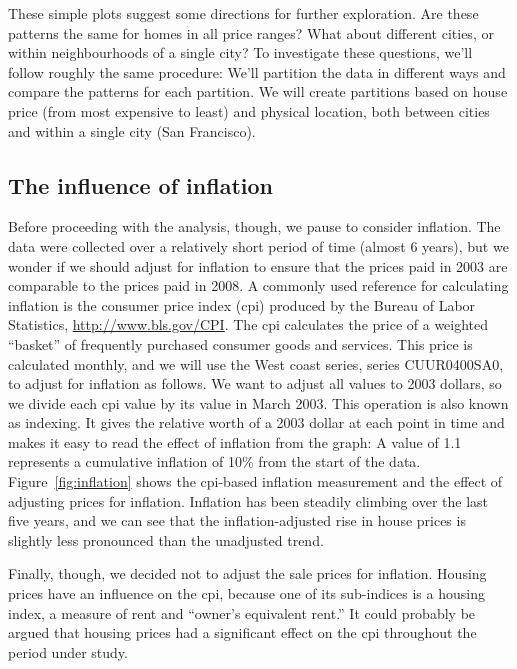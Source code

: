 \documentclass[oneside]{article}
\begin{document}
These simple plots suggest some directions for further exploration.  Are these patterns the same for homes in all price ranges?  What about different cities, or within neighbourhoods of a single city?  To investigate these questions, we'll follow roughly the same procedure:  We'll partition the data in different ways and compare the patterns for each partition.  We will create partitions based on house price (from most expensive to least) and physical location, both between cities and within a single city (San Francisco).

\subsection{The influence of inflation}

Before proceeding with the analysis, though, we pause to consider inflation. The data were collected over a relatively short period of time (almost 6 years), but we wonder if we should adjust for inflation to ensure that the prices paid in 2003 are comparable to the prices paid in 2008.  A commonly used reference for calculating inflation is the consumer price index ({\sc cpi}) produced by the Bureau of Labor Statistics, \url{http://www.bls.gov/CPI}.  The {\sc cpi} calculates the price of a weighted ``basket'' of frequently purchased consumer goods and services.  This price is calculated monthly, and we will use the West coast series, series CUUR0400SA0, to adjust for inflation as follows.  We want to adjust all values to 2003 dollars, so we divide each {\sc cpi} value by its value in March 2003.  This operation is also known as indexing.  It gives the relative worth of a 2003 dollar at each point in time and makes it easy to read the effect of inflation from the graph: A value of 1.1 represents a cumulative inflation of 10\% from the start of the data.  
Figure~\ref{fig:inflation} shows the {\sc cpi}-based inflation measurement and the effect of adjusting prices for inflation.  Inflation has been steadily climbing over the last five years, and we can see that the inflation-adjusted rise in house prices is slightly less pronounced than the unadjusted trend. 

Finally, though, we decided not to adjust the sale prices for inflation. Housing prices have an influence on the {\sc cpi}, because one of its sub-indices is a housing index, a measure of rent and ``owner's equivalent rent.''  It could probably be argued that housing prices had a significant effect on the {\sc cpi} throughout the period under study.
\end{document}
